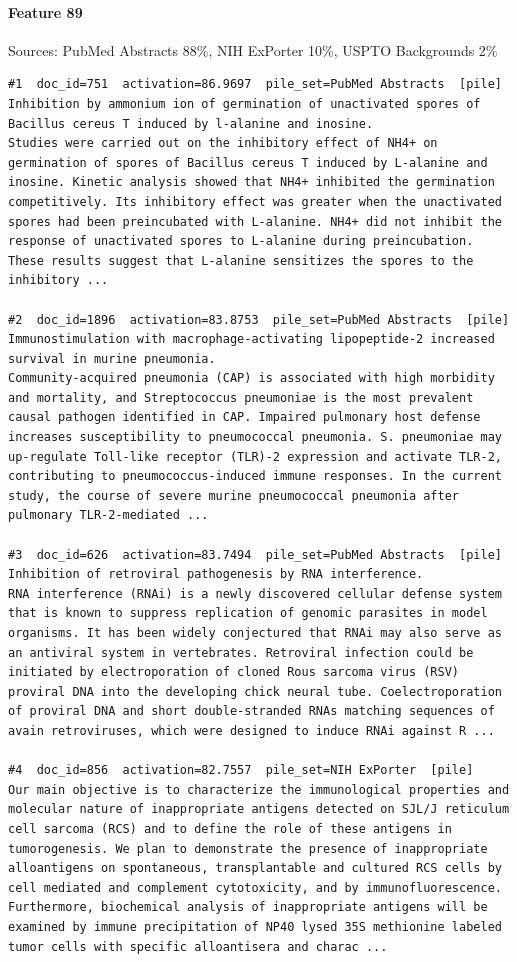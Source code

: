 \paragraph*{Feature 89} Sources: PubMed Abstracts 88\%, NIH ExPorter 10\%, USPTO Backgrounds 2\%

\begin{verbatim}
#1  doc_id=751  activation=86.9697  pile_set=PubMed Abstracts  [pile]
Inhibition by ammonium ion of germination of unactivated spores of Bacillus cereus T induced by l-alanine and inosine.
Studies were carried out on the inhibitory effect of NH4+ on germination of spores of Bacillus cereus T induced by L-alanine and inosine. Kinetic analysis showed that NH4+ inhibited the germination competitively. Its inhibitory effect was greater when the unactivated spores had been preincubated with L-alanine. NH4+ did not inhibit the response of unactivated spores to L-alanine during preincubation. These results suggest that L-alanine sensitizes the spores to the inhibitory ...

#2  doc_id=1896  activation=83.8753  pile_set=PubMed Abstracts  [pile]
Immunostimulation with macrophage-activating lipopeptide-2 increased survival in murine pneumonia.
Community-acquired pneumonia (CAP) is associated with high morbidity and mortality, and Streptococcus pneumoniae is the most prevalent causal pathogen identified in CAP. Impaired pulmonary host defense increases susceptibility to pneumococcal pneumonia. S. pneumoniae may up-regulate Toll-like receptor (TLR)-2 expression and activate TLR-2, contributing to pneumococcus-induced immune responses. In the current study, the course of severe murine pneumococcal pneumonia after pulmonary TLR-2-mediated ...

#3  doc_id=626  activation=83.7494  pile_set=PubMed Abstracts  [pile]
Inhibition of retroviral pathogenesis by RNA interference.
RNA interference (RNAi) is a newly discovered cellular defense system that is known to suppress replication of genomic parasites in model organisms. It has been widely conjectured that RNAi may also serve as an antiviral system in vertebrates. Retroviral infection could be initiated by electroporation of cloned Rous sarcoma virus (RSV) proviral DNA into the developing chick neural tube. Coelectroporation of proviral DNA and short double-stranded RNAs matching sequences of avain retroviruses, which were designed to induce RNAi against R ...

#4  doc_id=856  activation=82.7557  pile_set=NIH ExPorter  [pile]
Our main objective is to characterize the immunological properties and molecular nature of inappropriate antigens detected on SJL/J reticulum cell sarcoma (RCS) and to define the role of these antigens in tumorogenesis. We plan to demonstrate the presence of inappropriate alloantigens on spontaneous, transplantable and cultured RCS cells by cell mediated and complement cytotoxicity, and by immunofluorescence. Furthermore, biochemical analysis of inappropriate antigens will be examined by immune precipitation of NP40 lysed 35S methionine labeled tumor cells with specific alloantisera and charac ...


\end{verbatim}
